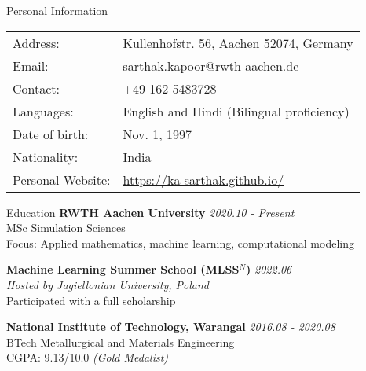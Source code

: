 \documentclass{resume}
\begin{document}
\begin{rSection}{Personal Information}\itemsep -3pt
\begin{multicols}{2}

  \begin{tabular}{|ll}
    Address: & Kullenhofstr. 56, Aachen 52074, Germany \\
    Email: & sarthak.kapoor@rwth-aachen.de \\
    Contact: & +49 162 5483728 \\
    Languages: &  English and Hindi (Bilingual proficiency) \\
    Date of birth: &  Nov. 1, 1997 \\ 
    Nationality: &  India \\
    Personal Website: & \url{https://ka-sarthak.github.io/}\\
  \end{tabular}

\end{multicols}
\end{rSection}


\begin{rSection}{Education}
{\bf RWTH Aachen University} \hfill {\em 2020.10 - Present}\\
MSc Simulation Sciences \\
Focus: Applied mathematics, machine learning, computational modeling 

{\bf Machine Learning Summer School (MLSS\(^N\))} \hfill {\em 2022.06}\\
{\em Hosted by Jagiellonian University, Poland}\\
Participated with a full scholarship

{\bf National Institute of Technology, Warangal} \hfill {\em 2016.08 - 2020.08} \\
BTech Metallurgical and Materials Engineering\hfill \\
{CGPA: 9.13/10.0} \emph{(Gold Medalist)}
\end{rSection}
\end{document}
